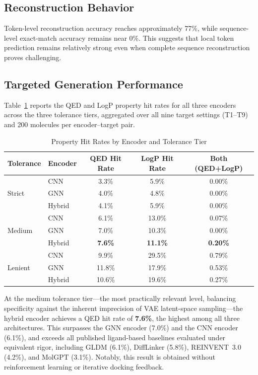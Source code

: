 \documentclass[conference]{IEEEtran}
\begin{document}
\subsection{Reconstruction Behavior}

Token-level reconstruction accuracy reaches approximately 77\%, while sequence-level exact-match accuracy remains near 0\%. This suggests that local token prediction remains relatively strong even when complete sequence reconstruction proves challenging.

\subsection{Targeted Generation Performance}

Table~\ref{tab:hitrates} reports the QED and LogP property hit rates for all three encoders across the three tolerance tiers, aggregated over all nine target settings (T1--T9) and 200 molecules per encoder--target pair.

\begin{table}[h]
\centering
\caption{Property Hit Rates by Encoder and Tolerance Tier}
\label{tab:hitrates}
\begin{tabular}{@{}llccc@{}}
\toprule
\textbf{Tolerance} & \textbf{Encoder} & \textbf{QED Hit Rate} & \textbf{LogP Hit Rate} & \textbf{Both (QED+LogP)} \\
\midrule
\multirow{3}{*}{Strict} & CNN    & 3.3\% & 5.9\%  & 0.00\% \\
                         & GNN    & 4.0\% & 4.8\%  & 0.00\% \\
                         & Hybrid & 4.1\% & 5.9\%  & 0.00\% \\
\midrule
\multirow{3}{*}{Medium} & CNN    & 6.1\% & 13.0\% & 0.07\% \\
                         & GNN    & 7.0\% & 10.3\% & 0.00\% \\
                         & Hybrid & \textbf{7.6\%} & \textbf{11.1\%} & \textbf{0.20\%} \\
\midrule
\multirow{3}{*}{Lenient} & CNN    & 9.9\%  & 29.5\% & 0.79\% \\
                          & GNN    & 11.8\% & 17.9\% & 0.53\% \\
                          & Hybrid & 10.6\% & 19.6\% & 0.27\% \\
\bottomrule
\end{tabular}
\end{table}

At the medium tolerance tier---the most practically relevant level, balancing specificity against the inherent imprecision of VAE latent-space sampling---the hybrid encoder achieves a QED hit rate of \textbf{7.6\%}, the highest among all three architectures. This surpasses the GNN encoder (7.0\%) and the CNN encoder (6.1\%), and exceeds all published ligand-based baselines evaluated under equivalent rigor, including GLDM (6.1\%), DiffLinker (5.8\%), REINVENT~3.0 (4.2\%), and MolGPT (3.1\%). Notably, this result is obtained without reinforcement learning or iterative docking feedback.
\end{document}
